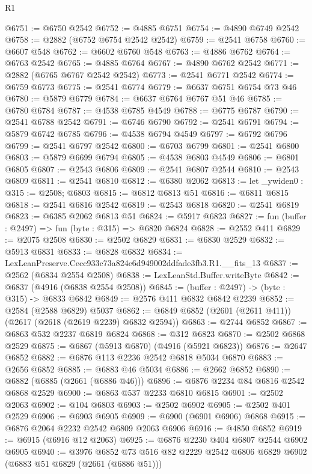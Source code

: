 \begin{lexlean}{R1}
\begin{coremodule}
@6751 := @6750 @2542
@6752 := @4885 @6751
@6754 := @4890 @6749 @2542
@6758 := @2882 (@6752 @6754 @2542 @2542)
@6759 := @2541 @6758
@6760 := @6607 @548
@6762 := @6602 @6760 @548
@6763 := @4886 @6762
@6764 := @6763 @2542
@6765 := @4885 @6764
@6767 := @4890 @6762 @2542
@6771 := @2882 (@6765 @6767 @2542 @2542)
@6773 := @2541 @6771 @2542
@6774 := @6759 @6773
@6775 := @2541 @6774
@6779 := @6637 @6751 @6754 @73 @46
@6780 := @5879 @6779
@6784 := @6637 @6764 @6767 @51 @46
@6785 := @6780 @6784
@6787 := @4538 @6785 @4549
@6788 := @6775 @6787
@6790 := @2541 @6788 @2542
@6791 := @6746 @6790
@6792 := @2541 @6791
@6794 := @5879 @6742 @6785
@6796 := @4538 @6794 @4549
@6797 := @6792 @6796
@6799 := @2541 @6797 @2542
@6800 := @6703 @6799
@6801 := @2541 @6800
@6803 := @5879 @6699 @6794
@6805 := @4538 @6803 @4549
@6806 := @6801 @6805
@6807 := @2543 @6806
@6809 := @2541 @6807 @2544
@6810 := @2543 @6809
@6811 := @2541 @6810
@6812 := @6380 @2062
@6813 := let _ywiden0 : @315 := @2508; @6803
@6815 := @6812 @6813 @51
@6816 := @6811 @6815
@6818 := @2541 @6816 @2542
@6819 := @2543 @6818
@6820 := @2541 @6819
@6823 := @6385 @2062 @6813 @51
@6824 := @5917 @6823
@6827 := fun (buffer : @2497) => fun (byte : @315) => @6820 @6824
@6828 := @2552 @411
@6829 := @2075 @2508
@6830 := @2502 @6829
@6831 := @6830 @2529
@6832 := @5913 @6831
@6833 := @6828 @6832
@6834 := LexLeanPreserve.Cecc933c73a824e6d949002ddfade3fb3.R1.__fits_13
@6837 := @2562 (@6834 @2554 @2508)
@6838 := LexLeanStd.Buffer.writeByte
@6842 := @6837 (@4916 (@6838 @2554 @2508))
@6845 := (buffer : @2497) -> (byte : @315) -> @6833 @6842
@6849 := @2576 @411 @6832 @6842 @2239
@6852 := @2584 (@2588 @6829) @5037
@6862 := @6849 @6852 (@2601 (@2611 @411)) (@2617 (@2618 (@2619 @2239) @6832 @2594))
@6863 := @2744 @6852
@6867 := @6863 @532 @2237 @6819 @6824
@6868 := @312 @6823
@6870 := @2502 @6868 @2529
@6875 := @6867 (@5913 @6870) (@4916 (@5921 @6823))
@6876 := @2647 @6852
@6882 := @6876 @113 @2236 @2542 @6818 @5034 @6870
@6883 := @2656 @6852
@6885 := @6883 @46 @5034
@6886 := @2662 @6852
@6890 := @6882 (@6885 (@2661 (@6886 @46)))
@6896 := @6876 @2234 @84 @6816 @2542 @6868 @2529
@6900 := @6863 @537 @2233 @6810 @6815
@6901 := @2502 @2063
@6902 := @104 @6803
@6903 := @2502 @6902
@6905 := @2502 @401 @2529
@6906 := @6903 @6905
@6909 := @6900 (@6901 @6906) @6868
@6915 := @6876 @2064 @2232 @2542 @6809 @2063 @6906
@6916 := @4850 @6852
@6919 := @6915 (@6916 @12 @2063)
@6925 := @6876 @2230 @404 @6807 @2544 @6902 @6905
@6940 := @3976
    @6852
    @73
    @516
    @82
    @2229
    @2542
    @6806
    @6829
    @6902
    (@6883 @51 @6829 (@2661 (@6886 @51)))

\end{coremodule}
\end{lexlean}
